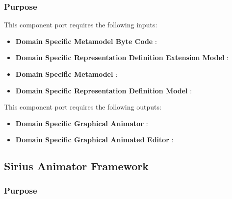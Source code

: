 \documentclass{gemoc} %
\begin{document}

\subsubsection{Purpose}

This component port requires the following inputs:
\begin{itemize}
  \item \textbf{Domain Specific Metamodel Byte Code} :
  \item \textbf{Domain Specific Representation Definition Extension Model} :
  \item \textbf{Domain Specific Metamodel} :
  \item \textbf{Domain Specific  Representation Definition Model} :
\end{itemize}

This component port requires the following outputs:
\begin{itemize}
  \item \textbf{Domain Specific Graphical Animator} :
  \item \textbf{Domain Specific Graphical Animated Editor} :
\end{itemize}

\subsection{Sirius Animator Framework}


\subsubsection{Purpose}
\end{document}
